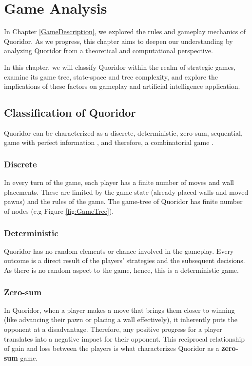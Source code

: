 \chapter{Game Analysis}
\label{GameAnalysis}

In Chapter \ref{GameDescription}, we explored the rules and gameplay mechanics of Quoridor.
As we progress, this chapter aims to deepen our understanding by analyzing Quoridor from a
theoretical and computational perspective.

In this chapter, we will classify Quoridor within the realm of strategic games, examine its game tree,
state-space and tree complexity, and explore the implications of these factors on gameplay and
artificial intelligence application.

\section{Classification of Quoridor}

Quoridor can be characterized as a discrete, deterministic, zero-sum, sequential, game with perfect
information \citep{Glendenning2002MasteringQ}, and therefore, a combinatorial game \citep{GameTheoryBook}. 

\subsection{Discrete}
In every turn of the game, each player has a finite number of moves and wall placements. These are limited by the game state (already placed walls and moved pawns) and the rules of the game. The game-tree of Quoridor has finite number of nodes (e.g Figure \ref{fig:GameTree}).

\subsection{Deterministic}
Quoridor has no random elements or chance involved in the gameplay. Every outcome is a direct result of the players' strategies and the subsequent decisions. As there is no random aspect to the game, hence, this is a deterministic game.

\subsection{Zero-sum}
In Quoridor, when a player makes a move that brings them closer to winning (like advancing their pawn or placing a wall effectively), it inherently puts the opponent at a disadvantage. Therefore, any positive progress for a player translates into a negative impact for their opponent. This reciprocal relationship of gain and loss between the players is what characterizes Quoridor as a \textbf{zero-sum} game.

